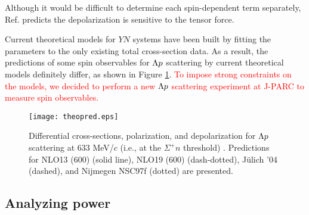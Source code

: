 Although it would be difficult to determine each spin-dependent term separately, Ref. \cite{chiEFT-1992} predicts the depolarization is sensitive to the tensor force. 

Current theoretical models for $YN$ systems have been built by fitting the parameters to the only existing total cross-section data. As a result, the predictions of some spin observables for $\Lambda p$ scattering by current theoretical models definitely differ, as shown in Figure \ref{fig-theopred}. \textcolor{red}{To impose strong constraints on the models, we decided to perform a new $\Lambda p$ scattering experiment at J-PARC to measure spin observables.}

\begin{figure}[h!]
 \begin{center}
   \texttt{[image: theopred.eps]}
   \caption{Differential cross-sections, polarization, and depolarization for $\Lambda p$ scattering at 633 MeV/$c$ (i.e., at the $\Sigma^{+}n$ threshold) \cite{chiEFT-2021}. Predictions for NLO13 (600) (solid line), NLO19 (600) (dash-dotted), J\"{u}lich '04 (dashed), and Nijmegen NSC97f (dotted) are presented.}
   \label{fig-theopred}
 \end{center}
\end{figure}


\subsection{Analyzing power}
\label{sec-anapow}

